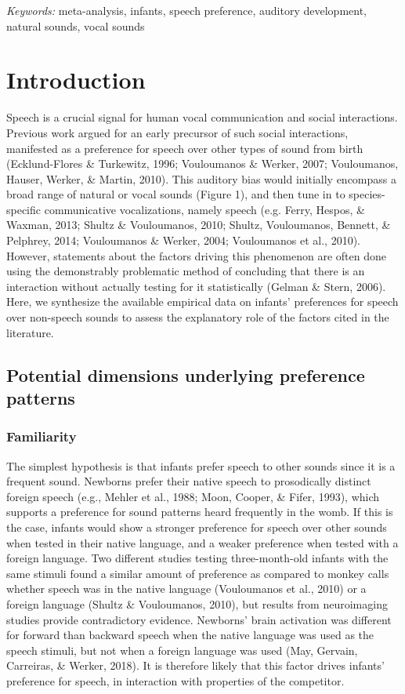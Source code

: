 \documentclass[man]{apa6}
\begin{document}
\emph{Keywords:} meta-analysis, infants, speech preference, auditory
development, natural sounds, vocal sounds

\section{Introduction}\label{introduction}

Speech is a crucial signal for human vocal communication and social
interactions. Previous work argued for an early precursor of such social
interactions, manifested as a preference for speech over other types of
sound from birth (Ecklund-Flores \& Turkewitz, 1996; Vouloumanos \&
Werker, 2007; Vouloumanos, Hauser, Werker, \& Martin, 2010). This
auditory bias would initially encompass a broad range of natural or
vocal sounds (Figure 1), and then tune in to species-specific
communicative vocalizations, namely speech (e.g. Ferry, Hespos, \&
Waxman, 2013; Shultz \& Vouloumanos, 2010; Shultz, Vouloumanos, Bennett,
\& Pelphrey, 2014; Vouloumanos \& Werker, 2004; Vouloumanos et al.,
2010). However, statements about the factors driving this phenomenon are
often done using the demonstrably problematic method of concluding that
there is an interaction without actually testing for it statistically
(Gelman \& Stern, 2006). Here, we synthesize the available empirical
data on infants' preferences for speech over non-speech sounds to assess
the explanatory role of the factors cited in the literature.

\subsection{Potential dimensions underlying preference
patterns}\label{potential-dimensions-underlying-preference-patterns}

\subsubsection{Familiarity}\label{familiarity}

The simplest hypothesis is that infants prefer speech to other sounds
since it is a frequent sound. Newborns prefer their native speech to
prosodically distinct foreign speech (e.g., Mehler et al., 1988; Moon,
Cooper, \& Fifer, 1993), which supports a preference for sound patterns
heard frequently in the womb. If this is the case, infants would show a
stronger preference for speech over other sounds when tested in their
native language, and a weaker preference when tested with a foreign
language. Two different studies testing three-month-old infants with the
same stimuli found a similar amount of preference as compared to monkey
calls whether speech was in the native language (Vouloumanos et al.,
2010) or a foreign language (Shultz \& Vouloumanos, 2010), but results
from neuroimaging studies provide contradictory evidence. Newborns'
brain activation was different for forward than backward speech when the
native language was used as the speech stimuli, but not when a foreign
language was used (May, Gervain, Carreiras, \& Werker, 2018). It is
therefore likely that this factor drives infants' preference for speech,
in interaction with properties of the competitor.
\end{document}
